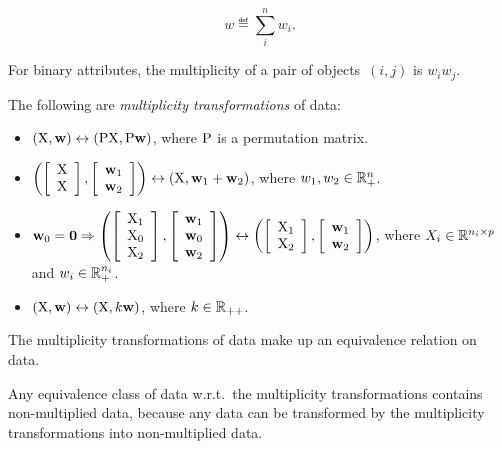 \documentclass[10pt,a4paper]{article}
\theoremstyle{plain} \newtheorem{Lem}{Lemma}
\begin{document}
$$ w \eqdef \sum_i^n w_i. $$

For binary attributes, the multiplicity of a pair of objects~$(i,j)$ is $w_i w_j$.
\comm{}

The following are {\em multiplicity transformations} of data:
\begin{itemize}
\item $(\mathrm X, \mathbf w) \leftrightarrow (\mathrm P \mathrm X, \mathrm P \mathbf w)$, where $\mathrm P$ is a permutation matrix.
\item $\left(\left[ \begin{array}{c} \mathrm X \\ \mathrm X \end{array} \right], \left[ \begin{array}{c} \mathbf w_1 \\ \mathbf w_2 \end{array} \right] \right) 
        \leftrightarrow (\mathrm X, \mathbf w_1 + \mathbf w_2)$,
  where $w_1, w_2 \in \mathbb R_+^n$.
\item $\mathbf w_0 = \mathbf 0 \Rightarrow 
        \left(\left[ \begin{array}{c} \mathrm X_1 \\ \mathrm X_0 \\ \mathrm X_2 \end{array} \right], \left[ \begin{array}{l} \mathbf w_1 \\ \mathbf w_0 \\ \mathbf w_2 \end{array} \right] \right) 
          \leftrightarrow \left(\left[ \begin{array}{c} \mathrm X_1 \\ \mathrm X_2 \end{array} \right], \left[ \begin{array}{c} \mathbf w_1 \\ \mathbf w_2 \end{array} \right] \right)$,
  where $X_i \in \mathbb R^{n_i \times p}$ and $w_i \in \mathbb R_+^{n_i}$.
\item $(\mathrm X, \mathbf w) \leftrightarrow (\mathrm X, k \mathbf w)$, where $k \in \mathbb R_{++}$.  
\end{itemize}

The multiplicity transformations of data make up an equivalence relation on data.

Any equivalence class of data w.r.t.~the multiplicity transformations contains non-multiplied data,
because any data can be transformed by the multiplicity transformations into non-multiplied data.
\end{document}
